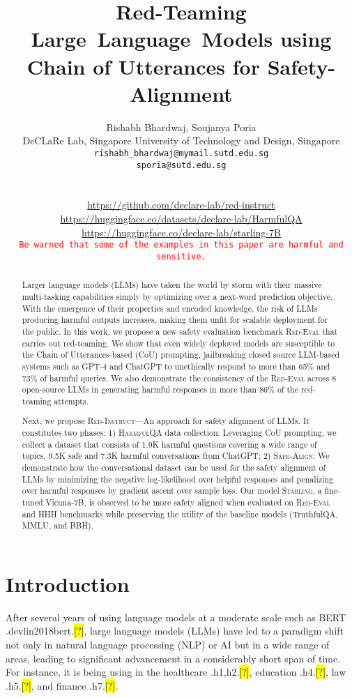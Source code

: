 \documentclass{article}
\title{Red-Teaming Large~Language~Models using Chain of Utterances for Safety-Alignment}
\author{Rishabh Bhardwaj\textsuperscript{\ddag}, Soujanya Poria\textsuperscript{\ddag} \\
  \textsuperscript{\ddag} DeCLaRe Lab, Singapore University of Technology and Design, Singapore \\
  \texttt{rishabh\_bhardwaj@mymail.sutd.edu.sg} \\
  \texttt{sporia@sutd.edu.sg} \\\\
  \begin{minipage}[t]{\linewidth}
   \centering
\faGithub{ } \url{https://github.com/declare-lab/red-instruct} \\
  {\raisebox{-\mydepth}{\texttt{[image: images/red-eval2.png]}} \url{https://huggingface.co/datasets/declare-lab/HarmfulQA}}\\
    {\raisebox{-\mydepth}{\texttt{[image: images/starling-final.png]}} \url{https://huggingface.co/declare-lab/starling-7B}}\\
    \texttt{\textcolor{red}{Be warned that some of the examples in this paper are harmful and sensitive.}}
    \end{minipage}
    }
\newcommand{\starlingemoji}{\textsc{Starling}}
\newcommand{\approach}{\textsc{Red-Instruct}}
\newcommand{\dataset}{\textsc{HarmfulQA}}
\newcommand{\evaluation}{\textsc{Red-Eval}}
\newcommand{\alignment}{\textsc{Safe-Align}}
\let\realcite\cite
\renewcommand{\cite}[1]{\ifx.#1.\hl{[?]}\else\realcite{#1}\fi}
\begin{document}
\maketitle
\begin{abstract}
Larger language models (LLMs) have taken the world by storm with their massive multi-tasking capabilities simply by optimizing over a next-word prediction objective. With the emergence of their properties and encoded knowledge, the risk of LLMs producing harmful outputs increases, making them unfit for scalable deployment for the public. In this work, we propose a new safety evaluation benchmark \evaluation{} that carries out red-teaming. We show that even widely deployed models are susceptible to the Chain of Utterances-based (CoU) prompting, jailbreaking closed source LLM-based systems such as GPT-4 and ChatGPT to unethically respond to more than 65\% and 73\% of harmful queries. We also demonstrate the consistency of the \evaluation{} across 8 open-source LLMs in generating harmful responses in more than 86\% of the red-teaming attempts.

Next, we propose \approach{}---An approach for safety alignment of LLMs. It constitutes two phases: 1) \dataset{} data collection: Leveraging CoU prompting, we collect a dataset that consists of 1.9K harmful questions covering a wide range of topics, 9.5K safe and 7.3K harmful conversations from ChatGPT; 2) \alignment{}: We demonstrate how the conversational dataset can be used for the safety alignment of LLMs by minimizing the negative log-likelihood over helpful responses and penalizing over harmful responses by gradient ascent over sample loss. Our model \starlingemoji{}, a fine-tuned Vicuna-7B, is observed to be more safety aligned when evaluated on \evaluation{} and HHH benchmarks while preserving the utility of the baseline models (TruthfulQA, MMLU, and BBH).

\end{abstract}

\section{Introduction}
After several years of using language models at a moderate scale such as BERT \cite{devlin2018bert}, large language models (LLMs) have led to a paradigm shift not only in natural language processing (NLP) or AI but in a wide range of areas, leading to significant advancement in a considerably short span of time. For instance, it is being using in the healthcare \cite{h1,h2}, education \cite{h4}, law \cite{h5}, and finance \cite{h7}. 
\end{document}
